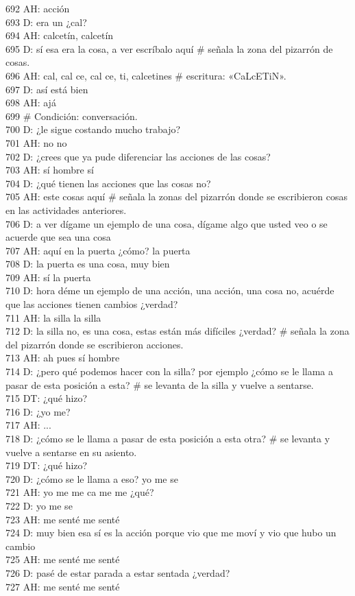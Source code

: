 692 AH: acción\\
693 D: era un ¿cal?\\
694 AH: calcetín, calcetín\\
695 D: sí esa era la cosa, a ver escríbalo aquí \# señala la zona del pizarrón de cosas.\\
696 AH: cal, cal ce, cal ce, ti, calcetines \# escritura: «CaLcETiN».\\
697 D: así está bien\\
698 AH: ajá\\
699 \# Condición: conversación.\\
700 D: ¿le sigue costando mucho trabajo?\\
701 AH: no no\\
702 D: ¿crees que ya pude diferenciar las acciones de las cosas?\\
703 AH: sí hombre sí\\
704 D: ¿qué tienen las acciones que las cosas no?\\
705 AH: este cosas aquí \# señala la zonas del pizarrón donde se escribieron cosas en las actividades anteriores.\\
706 D: a ver dígame un ejemplo de una cosa, dígame algo que usted veo o se acuerde que sea una cosa\\
707 AH: aquí en la puerta ¿cómo? la puerta\\
708 D: la puerta es una cosa, muy bien\\
709 AH: sí la puerta\\
710 D: hora déme un ejemplo de una acción, una acción, una cosa no, acuérde que las acciones tienen cambios ¿verdad?\\
711 AH: la silla la silla\\
712 D: la silla no, es una cosa, estas están más difíciles ¿verdad? \# señala la zona del pizarrón donde se escribieron acciones.\\
713 AH: ah pues sí hombre\\
714 D: ¿pero qué podemos hacer con la silla? por ejemplo ¿cómo se le llama a pasar de esta posición a esta? \# se levanta de la silla y vuelve a sentarse.\\
715 DT: ¿qué hizo?\\
716 D: ¿yo me?\\
717 AH: ...\\
718 D: ¿cómo se le llama a pasar de esta posición a esta otra? \# se levanta y vuelve a sentarse en su asiento.\\
719 DT: ¿qué hizo?\\
720 D: ¿cómo se le llama a eso? yo me se\\
721 AH: yo me me ca me me ¿qué?\\
722 D: yo me se\\
723 AH: me senté me senté\\
724 D: muy bien esa sí es la acción porque vio que me moví y vio que hubo un cambio\\
725 AH: me senté me senté\\
726 D: pasé de estar parada a estar sentada ¿verdad?\\
727 AH: me senté me senté\\

